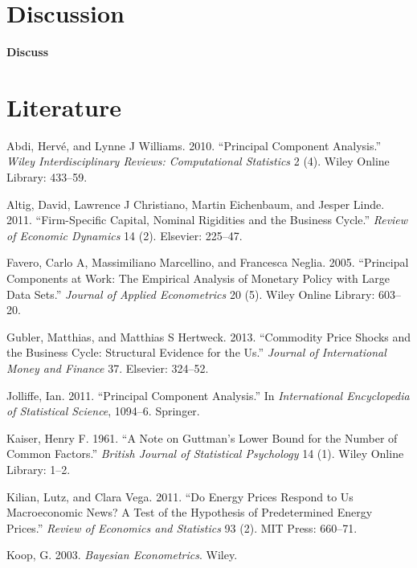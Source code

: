 \documentclass[12pt,]{article}
\begin{document}
\section{Discussion}\label{discussion}

\textbf{Discuss}

\newpage

\section{Literature}\label{literature}

\hypertarget{refs}{}
\hypertarget{ref-abdi2010principal}{}
Abdi, Hervé, and Lynne J Williams. 2010. ``Principal Component
Analysis.'' \emph{Wiley Interdisciplinary Reviews: Computational
Statistics} 2 (4). Wiley Online Library: 433--59.

\hypertarget{ref-altig2011firm}{}
Altig, David, Lawrence J Christiano, Martin Eichenbaum, and Jesper
Linde. 2011. ``Firm-Specific Capital, Nominal Rigidities and the
Business Cycle.'' \emph{Review of Economic Dynamics} 14 (2). Elsevier:
225--47.

\hypertarget{ref-favero2005principal}{}
Favero, Carlo A, Massimiliano Marcellino, and Francesca Neglia. 2005.
``Principal Components at Work: The Empirical Analysis of Monetary
Policy with Large Data Sets.'' \emph{Journal of Applied Econometrics} 20
(5). Wiley Online Library: 603--20.

\hypertarget{ref-gubler2013commodity}{}
Gubler, Matthias, and Matthias S Hertweck. 2013. ``Commodity Price
Shocks and the Business Cycle: Structural Evidence for the Us.''
\emph{Journal of International Money and Finance} 37. Elsevier: 324--52.

\hypertarget{ref-jolliffe2011principal}{}
Jolliffe, Ian. 2011. ``Principal Component Analysis.'' In
\emph{International Encyclopedia of Statistical Science}, 1094--6.
Springer.

\hypertarget{ref-kaiser1961note}{}
Kaiser, Henry F. 1961. ``A Note on Guttman's Lower Bound for the Number
of Common Factors.'' \emph{British Journal of Statistical Psychology} 14
(1). Wiley Online Library: 1--2.

\hypertarget{ref-kilian2011energy}{}
Kilian, Lutz, and Clara Vega. 2011. ``Do Energy Prices Respond to Us
Macroeconomic News? A Test of the Hypothesis of Predetermined Energy
Prices.'' \emph{Review of Economics and Statistics} 93 (2). MIT Press:
660--71.

\hypertarget{ref-koop2003bayesian}{}
Koop, G. 2003. \emph{Bayesian Econometrics}. Wiley.
\end{document}
